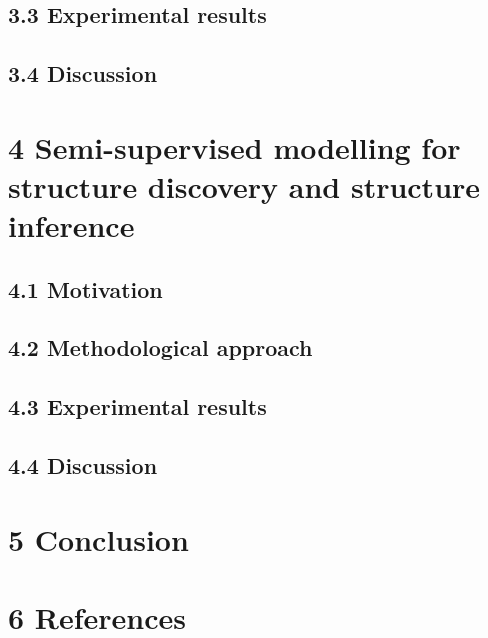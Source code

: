 \documentclass[authoryear,review,3p]{elsarticle}
\begin{document}
\subsection*{3.3 Experimental results}
\subsection*{3.4 Discussion}


\section*{4 Semi-supervised modelling for structure discovery
and structure inference}

\subsection*{4.1 Motivation}
\subsection*{4.2 Methodological approach}
\subsection*{4.3 Experimental results}
\subsection*{4.4 Discussion}




\section*{5 Conclusion}






\bigskip
\section*{6 References}



\end{document}
